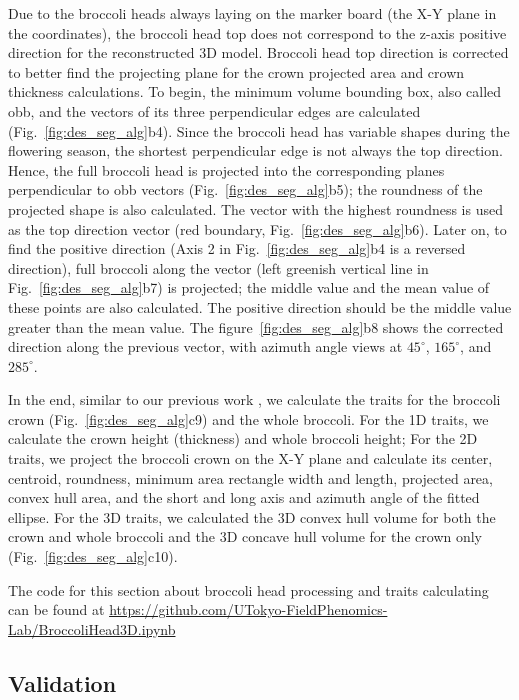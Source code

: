 Due to the broccoli heads always laying on the marker board (the X-Y plane in the coordinates), the broccoli head top does not correspond to the z-axis positive direction for the reconstructed 3D model. Broccoli head top direction is corrected to better find the projecting plane for the crown projected area and crown thickness calculations. To begin, the minimum volume bounding box, also called \gls{obb}, and the vectors of its three perpendicular edges are calculated (Fig.~\ref{fig:des_seg_alg}b4). Since the broccoli head has variable shapes during the flowering season, the shortest perpendicular edge is not always the top direction. Hence, the full broccoli head is projected into the corresponding planes perpendicular to \gls{obb} vectors (Fig.~\ref{fig:des_seg_alg}b5); the roundness of the projected shape is also calculated. The vector with the highest roundness is used as the top direction vector (red boundary, Fig.~\ref{fig:des_seg_alg}b6). Later on, to find the positive direction (Axis 2 in Fig.~\ref{fig:des_seg_alg}b4 is a reversed direction), full broccoli along the vector (left greenish vertical line in Fig.~\ref{fig:des_seg_alg}b7) is projected; the middle value and the mean value of these points are also calculated. The positive direction should be the middle value greater than the mean value. The figure~\ref{fig:des_seg_alg}b8 shows the corrected direction along the previous vector, with azimuth angle views at $45^\circ$, $165^\circ$, and $285^\circ$.

In the end, similar to our previous work \citep{feldman_easydcp_2021}, we calculate the traits for the broccoli crown (Fig.~\ref{fig:des_seg_alg}c9) and the whole broccoli. For the 1D traits, we calculate the crown height (thickness) and whole broccoli height; For the 2D traits, we project the broccoli crown on the X-Y plane and calculate its center, centroid, roundness, minimum area rectangle width and length, projected area, convex hull area, and the short and long axis and azimuth angle of the fitted ellipse. For the 3D traits, we calculated the 3D convex hull volume for both the crown and whole broccoli and the 3D concave hull volume for the crown only (Fig.~\ref{fig:des_seg_alg}c10). 

The code for this section about broccoli head processing and traits calculating can be found at \url{https://github.com/UTokyo-FieldPhenomics-Lab/BroccoliHead3D.ipynb}

\subsection{Validation}

